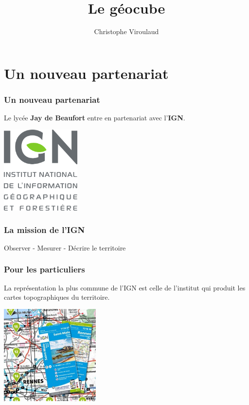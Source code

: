 \documentclass[svgnames,11pt]{beamer}
\author[]{Christophe Viroulaud}
\title{Le géocube}
\date{\framebox{\textbf{SIE 01}}}
\institute{Seconde - SNT}
\begin{document}
\begin{frame}
\titlepage
\end{frame}
\section{Un nouveau partenariat}
\begin{frame}
    \frametitle{Un nouveau partenariat}

Le lycée \textbf{Jay de Beaufort} entre en partenariat avec l'\textbf{IGN}.
\vspace{1cm}
\begin{center}
\centering
\includegraphics[width=4cm]{ressources/ign.png}
\end{center}
\end{frame}
\begin{frame}
    \frametitle{La mission de l'IGN}

    \begin{center}
        {\Large Observer - Mesurer - Décrire le territoire}
    \end{center}

\end{frame}
\begin{frame}
    \frametitle{Pour les particuliers}
La représentation la plus commune de l'IGN est celle de l'institut qui produit les cartes topographiques du territoire.
    \begin{center}
    \centering
    \includegraphics[width=5cm]{ressources/ign-carte.jpg}
    \label{IMG}
    \end{center}

\end{frame}
\end{document}
